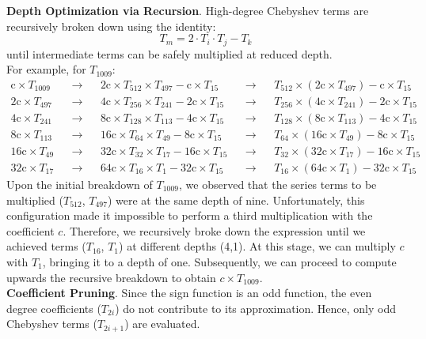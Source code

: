 \documentclass[article]{iacrtrans}
\begin{document}
\textbf{Depth Optimization via Recursion}. High-degree Chebyshev terms are recursively broken down using the identity:
    \[
        T_m = 2 \cdot T_i \cdot T_j - T_k
    \]
    until intermediate terms can be safely multiplied at reduced depth.  \\
    For example, for $T_{1009}$:
\begin{align}
    \text{c}\times T_{1009} &&\rightarrow&& \text{2c}\times T_{512}\times T_{497}-\text{c}\times T_{15} && \rightarrow &&   T_{512}\times(\text{2c}\times T_{497})-\text{c}\times T_{15}\\
    \text{2c}\times T_{497} && \rightarrow &&  \text{4c}\times T_{256}\times T_{241}-\text{2c}\times T_{15} && \rightarrow  &&  T_{256}\times(\text{4c}\times T_{241})-\text{2c}\times T_{15}\\
    \text{4c}\times T_{241} && \rightarrow  && \text{8c}\times T_{128}\times T_{113}-\text{4c}\times T_{15} && \rightarrow &&   T_{128}\times(\text{8c}\times T_{113})-\text{4c}\times T_{15}\\
    \text{8c}\times T_{113} && \rightarrow &&  \text{16c}\times T_{64}\times T_{49}-\text{8c}\times T_{15} && \rightarrow &&   T_{64}\times(\text{16c}\times T_{49})-\text{8c}\times T_{15}\\
    \text{16c}\times T_{49} && \rightarrow &&  \text{32c}\times T_{32}\times T_{17}-\text{16c}\times T_{15} && \rightarrow &&   T_{32}\times(\text{32c}\times T_{17})-\text{16c}\times T_{15}\\
    \text{32c}\times T_{17} && \rightarrow &&  \text{64c}\times T_{16}\times T_{1}-\text{32c}\times T_{15} && \rightarrow &&   T_{16}\times(\text{64c}\times T_{1})-\text{32c}\times T_{15}
\end{align}
Upon the initial breakdown of ${T}_{1009}$, we observed that the series terms to be multiplied (${T}_{512}$, ${T}_{497}$) were at the same depth of nine. Unfortunately, this configuration made it impossible to perform a third multiplication with the coefficient ${c}$. Therefore, we recursively broke down the expression until we achieved terms (${T}_{16}$, ${T}_{1}$) at different depths (4,1). At this stage, we can multiply ${c}$ with ${T}_{1}$, bringing it to a depth of one. Subsequently, we can proceed to compute upwards the recursive breakdown to obtain $c \times {T}_{1009}$.\\

\textbf{Coefficient Pruning}. Since the sign function is an odd function, the even degree coefficients ($T_{2i}$) do not contribute to its approximation. Hence, only odd Chebyshev terms ($T_{2i+1}$) are evaluated.\\
    
\end{document}
